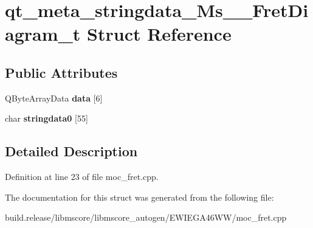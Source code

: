 \hypertarget{structqt__meta__stringdata___ms_____fret_diagram__t}{}\section{qt\+\_\+meta\+\_\+stringdata\+\_\+\+Ms\+\_\+\+\_\+\+Fret\+Diagram\+\_\+t Struct Reference}
\label{structqt__meta__stringdata___ms_____fret_diagram__t}
\subsection*{Public Attributes}
\begin{DoxyCompactItemize}
\item 
\mbox{\label{structqt__meta__stringdata___ms_____fret_diagram__t_ac9fd2631e2406a9780f2712659d5d2b1}} 
Q\+Byte\+Array\+Data {\bfseries data} \mbox{[}6\mbox{]}
\item 
\mbox{\label{structqt__meta__stringdata___ms_____fret_diagram__t_a95d4033fd3acc825d43db22b5882b467}} 
char {\bfseries stringdata0} \mbox{[}55\mbox{]}
\end{DoxyCompactItemize}


\subsection{Detailed Description}


Definition at line 23 of file moc\+\_\+fret.\+cpp.



The documentation for this struct was generated from the following file\+:\begin{DoxyCompactItemize}
\item 
build.\+release/libmscore/libmscore\+\_\+autogen/\+E\+W\+I\+E\+G\+A46\+W\+W/moc\+\_\+fret.\+cpp\end{DoxyCompactItemize}
